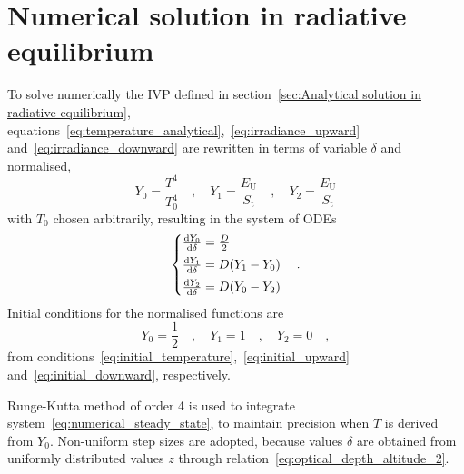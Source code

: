 \documentclass[a4paper,10pt,twocolumn,\classoptions]{article}
\begin{document}
\section{Numerical solution in radiative equilibrium}
\label{sec:Numerical solution in radiative equilibrium}
To solve numerically the IVP defined in section~\ref{sec:Analytical solution in radiative equilibrium}, equations~\eqref{eq:temperature_analytical},~\eqref{eq:irradiance_upward} and~\eqref{eq:irradiance_downward} are rewritten in terms of variable $\delta$ and normalised,
\begin{equation}
  \label{eq:normalisation}
  Y_0 = \frac{T^4}{T_0^4}
  \quad , \quad
  Y_1 = \frac{E_\text{U}}{S_\text{t}}
  \quad , \quad
  Y_2 = \frac{E_\text{U}}{S_\text{t}}
\end{equation}
with $T_0$ chosen arbitrarily, resulting in the system of ODEs
\begin{equation}
  \label{eq:numerical_steady_state}
  \left\{
  \begin{array}{@{}l@{}}
    \odv{Y_0}{\delta} = \frac{D}{2} \\[0.5em]
    \odv{Y_1}{\delta} = D (Y_1 - Y_0) \\[0.5em]
    \odv{Y_2}{\delta} = D (Y_0 - Y_2)
  \end{array}
  \right.
  \quad .
\end{equation}
Initial conditions for the normalised functions are
\begin{equation}
  \label{eq:initial_normalisation}
  Y_0 = \frac{1}{2}
  \quad , \quad
  Y_1 = 1
  \quad , \quad
  Y_2 = 0
  \quad ,
\end{equation}
from conditions~\eqref{eq:initial_temperature},~\eqref{eq:initial_upward} and~\eqref{eq:initial_downward}, respectively.

Runge-Kutta method of order 4 is used to integrate system~\eqref{eq:numerical_steady_state}, to maintain precision when $T$ is derived from $Y_0$. Non-uniform step sizes are adopted, because values $\delta$ are obtained from uniformly distributed values $z$ through relation~\eqref{eq:optical_depth_altitude_2}.
\end{document}
